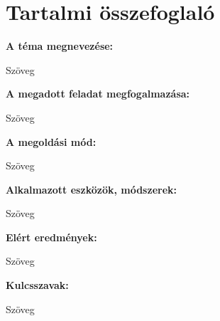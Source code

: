 \chapter*{Tartalmi összefoglaló}

\noindent\textbf{A téma megnevezése:}

\noindent Szöveg

\noindent\textbf{A megadott feladat megfogalmazása:}

\noindent Szöveg

\noindent\textbf{A megoldási mód:}

\noindent Szöveg

\noindent\textbf{Alkalmazott eszközök, módszerek:}

\noindent Szöveg

\noindent\textbf{Elért eredmények:}

\noindent Szöveg

\noindent\textbf{Kulcsszavak:}

\noindent Szöveg
